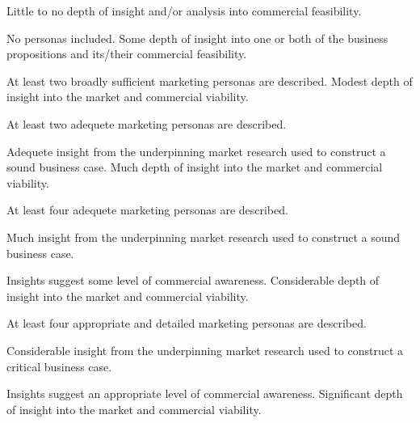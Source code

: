 \documentclass{../../fal_assignment}
\begin{document}
\begin{markingrubric}
%
%
        \grade  \fail	Little to no depth of insight and/or analysis into commercial feasibility.
        \par 		No personas included.
        \grade 		Some depth of insight into one or both of the business propositions and its/their commercial feasibility.
        \par 		At least two broadly sufficient marketing personas are described.
        \grade 		Modest depth of insight into the market and commercial viability.
        \par 		At least two adequete marketing personas are described.
        \par 		Adequete insight from the underpinning market research used to construct a sound business case.
        \grade 		Much depth of insight into the market and commercial viability.
        \par 		At least four adequete marketing personas are described.
        \par 		Much insight from the underpinning market research used to construct a sound business case.
    	\par 		Insights suggest some level of commercial awareness.
        \grade 		Considerable depth of insight into the market and commercial viability.
        \par 		At least four appropriate and detailed marketing personas are described.
        \par 		Considerable insight from the underpinning market research used to construct a critical business case.
    	\par 		Insights suggest an appropriate level of commercial awareness.
        \grade 		Significant depth of insight into the market and commercial viability.

\end{markingrubric}
\end{document}
